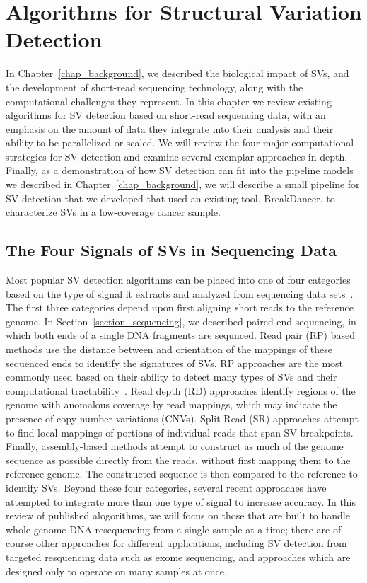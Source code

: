 \chapter{Algorithms for Structural Variation Detection}\label{chap_related_work}

In Chapter~\ref{chap_background}, we described the biological impact of SVs, and the development of short-read sequencing technology, along with the computational challenges they represent. In this chapter we review existing algorithms for SV detection based on short-read sequencing data, with an emphasis on the amount of data they integrate into their analysis and their ability to be parallelized or scaled. We will review the four major computational strategies for SV detection and examine several exemplar approaches in depth. Finally, as a demonstration of how SV detection can fit into the pipeline models we described in Chapter~\ref{chap_background}, we will describe a small pipeline for SV detection that we developed that used an existing tool, BreakDancer, to characterize SVs in a low-coverage cancer sample. 

\section{The Four Signals of SVs in Sequencing Data}

Most popular SV detection algorithms can be placed into one of four categories based on the type of signal it extracts and analyzed from sequencing data sets~\cite{Alkan:2011p547,Koboldt:2012gj}. The first three categories depend upon first aligning short reads to the reference genome. In Section~\ref{section_sequencing}, we described paired-end sequencing, in which both ends of a single DNA fragments are sequnced. Read pair (RP) based methods use the distance between and orientation of the mappings of these sequenced ends to identify the signatures of SVs. RP approaches are the most commonly used based on their ability to detect many types of SVs and their computational tractability~\cite{Alkan:2011p547}. Read depth (RD) approaches identify regions of the genome with anomalous coverage by read mappings, which may indicate the presence of copy number variations (CNVs). Split Read (SR) approaches attempt to find local mappings of portions of individual reads that span SV breakpoints. Finally, assembly-based methods attempt to construct as much of the genome sequence as possible directly from the reads, without first mapping them to the reference genome. The constructed sequence is then compared to the reference to identify SVs. Beyond these four categories, several recent approaches have attempted to integrate more than one type of signal to increase accuracy. In this review of published alogorithms, we will focus on those that are built to handle whole-genome DNA resequencing from a single sample at a time; there are of course other approaches for different applications, including SV detection from targeted resquencing data such as exome sequencing, and approaches which are designed only to operate on many samples at once.

